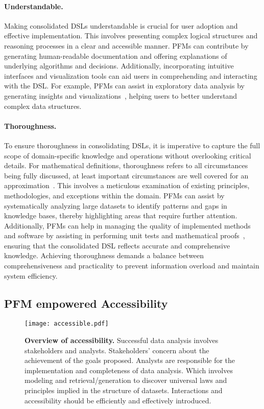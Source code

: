   \paragraph{Understandable.} Making consolidated DSLs understandable is crucial for user adoption and effective implementation. This involves presenting complex logical structures and reasoning processes in a clear and accessible manner. PFMs can contribute by generating human-readable documentation and offering explanations of underlying algorithms and decisions. Additionally, incorporating intuitive interfaces and visualization tools can aid users in comprehending and interacting with the DSL. For example, PFMs can assist in exploratory data analysis by generating insights and visualizations~\cite{ma2023insightpilot, Dibia2023LIDAAT}, helping users to better understand complex data structures.
  
  \paragraph{Thoroughness.} To ensure thoroughness in consolidating DSLs, it is imperative to capture the full scope of domain-specific knowledge and operations without overlooking critical details. For mathematical definitions, thoroughness refers to all circumstances being fully discussed, at least important circumstances are well covered for an approximation~\cite{brand2023parameterized}. This involves a meticulous examination of existing principles, methodologies, and exceptions within the domain. PFMs can assist by systematically analyzing large datasets to identify patterns and gaps in knowledge bases, thereby highlighting areas that require further attention. Additionally, PFMs can help in managing the quality of implemented methods and software by assisting in performing unit tests and mathematical proofs~\cite{Wang2024TheoremLlamaTG, Carrott2024CoqPytPN}, ensuring that the consolidated DSL reflects accurate and comprehensive knowledge. Achieving thoroughness demands a balance between comprehensiveness and practicality to prevent information overload and maintain system efficiency.
  
  
  
  
  \subsection{PFM empowered Accessibility}\label{sec:interpretability}
  
  \begin{figure*}[h]
    \centering
    \texttt{[image: accessible.pdf]} %
    \caption{\textbf{Overview of accessibility.} Successful data analysis involves stakeholders and analysts. Stakeholders' concern about the achievement of the goals proposed. Analysts are responsible for the implementation and completeness of data analysis. Which involves modeling and retrieval/generation to discover universal laws and principles implied in the structure of datasets. Interactions and accessibility should be efficiently and effectively introduced.}
    \label{fig:accessible}
  \end{figure*}
  

